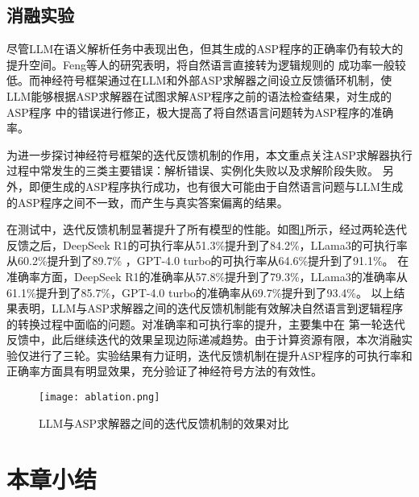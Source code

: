 \subsection{消融实验}
尽管LLM在语义解析任务中表现出色，但其生成的ASP程序的正确率仍有较大的提升空间。Feng\cite{feng2024language}等人的研究表明，将自然语言直接转为逻辑规则的
成功率一般较低。而神经符号框架通过在LLM和外部ASP求解器之间设立反馈循环机制，使LLM能够根据ASP求解器在试图求解ASP程序之前的语法检查结果，对生成的ASP程序
中的错误进行修正，极大提高了将自然语言问题转为ASP程序的准确率。

为进一步探讨神经符号框架的迭代反馈机制的作用，本文重点关注ASP求解器执行过程中常发生的三类主要错误：解析错误、实例化失败以及求解阶段失败。
另外，即便生成的ASP程序执行成功，也有很大可能由于自然语言问题与LLM生成的ASP程序之间不一致，而产生与真实答案偏离的结果。

在测试中，迭代反馈机制显著提升了所有模型的性能。如图\ref{fig:ablation}所示，经过两轮迭代反馈之后，DeepSeek R1的可执行率从51.3\%提升到了84.2\%，LLama3的可执行率从60.2\%提升到了89.7\%
，GPT-4.0 turbo的可执行率从64.6\%提升到了91.1\%。
在准确率方面，DeepSeek R1的准确率从57.8\%提升到了79.3\%，LLama3的准确率从61.1\%提升到了85.7\%，GPT-4.0 turbo的准确率从69.7\%提升到了93.4\%。
以上结果表明，LLM与ASP求解器之间的迭代反馈机制能有效解决自然语言到逻辑程序的转换过程中面临的问题。对准确率和可执行率的提升，主要集中在
第一轮迭代反馈中，此后继续迭代的效果呈现边际递减趋势。由于计算资源有限，本次消融实验仅进行了三轮。实验结果有力证明，迭代反馈机制在提升ASP程序的可执行率和
正确率方面具有明显效果，充分验证了神经符号方法的有效性。

\begin{figure}
    \centering
    \texttt{[image: ablation.png]}
    \caption{LLM与ASP求解器之间的迭代反馈机制的效果对比}
    \label{fig:ablation}
\end{figure}

\section{本章小结}